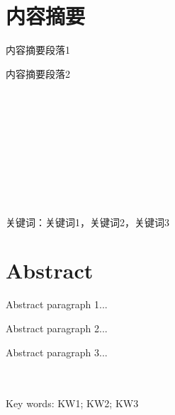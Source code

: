 \newpage

\setcounter{secnumdepth}{0}
\setcounter{page}{1}

\section{内容摘要}
{
    \fsong{}
        内容摘要段落1
        
        内容摘要段落2

        ~\\~\\~\\~\\~\\~\\~\\~\\~\\
    
    \hei{}\noindent
        关键词：关键词1，关键词2，关键词3

}
\thispagestyle{empty}
\newpage

\section{Abstract}
{
    Abstract paragraph 1...
            
    Abstract paragraph 2...

    Abstract paragraph 3...
        

    ~\\~\\
    \noindent
        Key words: KW1; KW2; KW3
        
}
\thispagestyle{empty}
